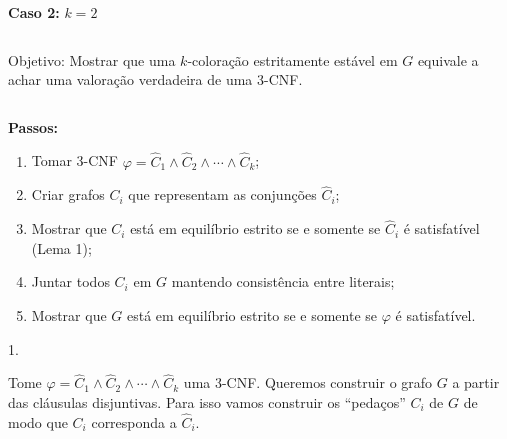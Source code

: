 \documentclass{beamer}
\newcommand{\cls}{\hat{C}}
\theoremstyle{plain}
\begin{document}
\begin{frame}
  \large\textbf{Caso 2:} $k=2$

  \normalsize
  \begin{columns}[t]
    \begin{column}{0.9\textwidth}
      \begin{block}{Objetivo:}
        Mostrar que uma $k$-coloração estritamente estável em $G$ equivale a achar uma valoração
        verdadeira de uma 3-CNF\@.
      \end{block}
    \end{column}
  \end{columns}
  \vspace{0.2in}

  \textbf{Passos:}
  \begin{enumerate}
    \item Tomar 3-CNF $\varphi=\cls_1\wedge\cls_2\wedge \cdots\wedge\cls_k$;
    \item Criar grafos $C_i$ que representam as conjunções $\hat{C}_i$;
    \item Mostrar que $C_i$ está em equilíbrio estrito se e somente se $\hat{C}_i$ é satisfatível
      (Lema 1);
    \item Juntar todos $C_i$ em $G$ mantendo consistência entre literais;
    \item Mostrar que $G$ está em equilíbrio estrito se e somente se $\varphi$ é satisfatível.
  \end{enumerate}
\end{frame}

\begin{frame}

  {\color{blue} 1.}

  Tome $\varphi=\cls_1\wedge\cls_2\wedge\cdots\wedge\cls_k$ uma 3-CNF\@. Queremos construir o grafo
  $G$ a partir das cláusulas disjuntivas. Para isso vamos construir os ``pedaços'' $C_i$ de $G$ de
  modo que $C_i$ corresponda a $\cls_i$.
\end{frame}
\end{document}
